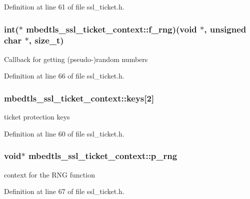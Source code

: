 Definition at line 61 of file ssl\-\_\-ticket.\-h.

\hypertarget{structmbedtls__ssl__ticket__context_a08d1247391c2ff04ba9c07c424329b6f}{
\subsubsection[{f\-\_\-rng}]{\setlength{\rightskip}{0pt plus 5cm}int($\ast$ mbedtls\-\_\-ssl\-\_\-ticket\-\_\-context\-::f\-\_\-rng)(void $\ast$, unsigned char $\ast$, size\-\_\-t)}}\label{structmbedtls__ssl__ticket__context_a08d1247391c2ff04ba9c07c424329b6f}
Callback for getting (pseudo-\/)random numbers 

Definition at line 66 of file ssl\-\_\-ticket.\-h.

\hypertarget{structmbedtls__ssl__ticket__context_a92f8b74506a299795117cf0b60504442}{
\subsubsection[{keys}]{ mbedtls\-\_\-ssl\-\_\-ticket\-\_\-context\-::keys\mbox{[}2\mbox{]}}}\label{structmbedtls__ssl__ticket__context_a92f8b74506a299795117cf0b60504442}
ticket protection keys 

Definition at line 60 of file ssl\-\_\-ticket.\-h.

\hypertarget{structmbedtls__ssl__ticket__context_a304d8f181d24a4ddbe5b7f0052229b9c}{
\subsubsection[{p\-\_\-rng}]{\setlength{\rightskip}{0pt plus 5cm}void$\ast$ mbedtls\-\_\-ssl\-\_\-ticket\-\_\-context\-::p\-\_\-rng}}\label{structmbedtls__ssl__ticket__context_a304d8f181d24a4ddbe5b7f0052229b9c}
context for the R\-N\-G function 

Definition at line 67 of file ssl\-\_\-ticket.\-h.

